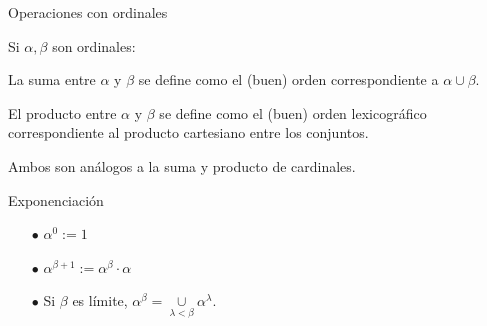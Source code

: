 \documentclass[10pt,spanish]{beamer}
\def\N{\mathbb{N}}
\begin{document}
\begin{frame}{Operaciones con ordinales}



Si $\alpha,\beta$ son ordinales:

La suma entre $\alpha$ y $\beta$ se define como el (buen) orden correspondiente a $\alpha \cup \beta$.

El producto entre $\alpha$ y $\beta$ se define como el (buen) orden lexicográfico correspondiente al producto cartesiano entre los conjuntos. \pause

Ambos son análogos a la suma y producto de cardinales.

\end{frame}

\begin{frame}{Exponenciación}
	\pause	
\begin{itemize}
	\item[$\bullet$]$\alpha^0:= 1$
	\item[$\bullet$]$\alpha^{\beta + 1} := \alpha^\beta \cdot \alpha$
	
	\item[$\bullet$]Si $\beta$ es límite, $\alpha^\beta = \underset{\lambda < \beta}{\cup} \alpha^\lambda$.
\end{itemize}


\end{frame}
\end{document}
